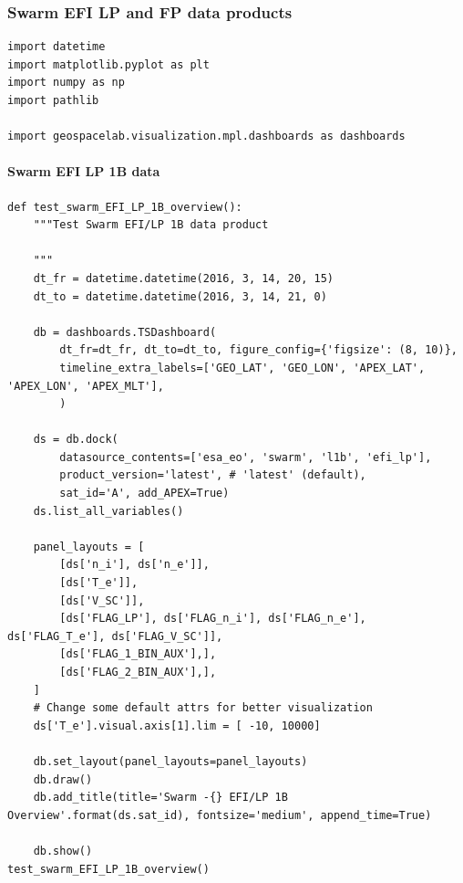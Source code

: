 \subsubsection{Swarm EFI LP and FP data products}

\begin{verbatim}
import datetime
import matplotlib.pyplot as plt
import numpy as np
import pathlib

import geospacelab.visualization.mpl.dashboards as dashboards
\end{verbatim}

\paragraph{Swarm EFI LP 1B data}

\begin{verbatim}
def test_swarm_EFI_LP_1B_overview():
    """Test Swarm EFI/LP 1B data product
    
    """
    dt_fr = datetime.datetime(2016, 3, 14, 20, 15)
    dt_to = datetime.datetime(2016, 3, 14, 21, 0)

    db = dashboards.TSDashboard(
        dt_fr=dt_fr, dt_to=dt_to, figure_config={'figsize': (8, 10)},
        timeline_extra_labels=['GEO_LAT', 'GEO_LON', 'APEX_LAT', 'APEX_LON', 'APEX_MLT'],
        )

    ds = db.dock(
        datasource_contents=['esa_eo', 'swarm', 'l1b', 'efi_lp'], 
        product_version='latest', # 'latest' (default),
        sat_id='A', add_APEX=True)
    ds.list_all_variables()
    
    panel_layouts = [
        [ds['n_i'], ds['n_e']],
        [ds['T_e']],
        [ds['V_SC']],
        [ds['FLAG_LP'], ds['FLAG_n_i'], ds['FLAG_n_e'], ds['FLAG_T_e'], ds['FLAG_V_SC']],
        [ds['FLAG_1_BIN_AUX'],],
        [ds['FLAG_2_BIN_AUX'],],
    ]
    # Change some default attrs for better visualization
    ds['T_e'].visual.axis[1].lim = [ -10, 10000]

    db.set_layout(panel_layouts=panel_layouts)
    db.draw()
    db.add_title(title='Swarm -{} EFI/LP 1B Overview'.format(ds.sat_id), fontsize='medium', append_time=True)

    db.show()
test_swarm_EFI_LP_1B_overview()
\end{verbatim}

